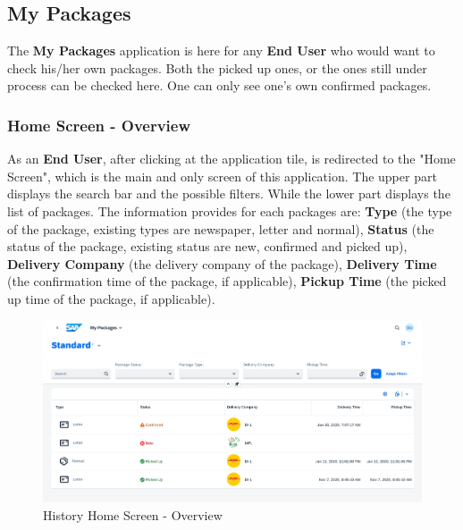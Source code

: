 % 

\subsection{My Packages}

The \textbf{My Packages} application is here for any \textbf{End User} who would want to check his/her own packages. Both the picked up ones, or the ones still under process can be checked here. One can only see one's own confirmed packages. 

\subsubsection{Home Screen - Overview}
As an \textbf{End User}, after clicking at the application tile, is redirected to the "Home Screen", which is the main and only screen of this application. The upper part displays the search bar and the possible filters. While the lower part displays the list of packages. The information provides for each packages are: \textbf{Type} (the type of the package, existing types are newspaper, letter and normal), \textbf{Status} (the status of the package, existing status are new, confirmed and picked up), \textbf{Delivery Company} (the delivery company of the package), \textbf{Delivery Time} (the confirmation time of the package, if applicable), \textbf{Pickup Time} (the picked up time of the package, if applicable).

\begin{figure}[H]
	\centering
	\includegraphics[width=1\linewidth]{images/user_doc/myPack/overview.png}
	\caption{History Home Screen - Overview}
	\label{fig:HistoryHome}
\end{figure}

